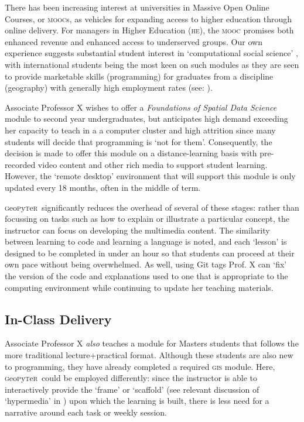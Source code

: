 \documentclass[letter, 11pt,titlepage]{article}
\newcommand{\gp}{\textsc{g}eo\textsc{p}y\textsc{t}e\textsc{r}~\/}
\begin{document}
There has been increasing interest at universities in Massive Open Online Courses, or \textsc{mooc}s, as vehicles for expanding access to higher education through online delivery. For managers in Higher Education (\textsc{he}), the \textsc{mooc} promises both enhanced revenue and enhanced access to underserved groups. Our own experience suggests substantial student interest in `computational social science' \citep{Lazer2009}, with international students being the most keen on such modules as they are seen to provide marketable skills (programming) for graduates from a discipline (geography) with generally high employment rates (see: \citeauthor{rgs2017} \citeyear{rgs2017}).

Associate Professor X wishes to offer a \emph{Foundations of Spatial Data Science} module to second year undergraduates, but anticipates high demand exceeding her capacity to teach in a a computer cluster and high attrition since many students will decide that programming is `not for them'. Consequently, the decision is made to offer this module on a distance-learning basis with pre-recorded video content and other rich media to support student learning. However, the `remote desktop' environment that will support this module is only updated every 18 months, often in the middle of term.

\gp significantly reduces the overhead of several of these stages: rather than focussing on tasks such as how to explain or illustrate a particular concept, the instructor can focus on developing the multimedia content. The similarity between learning to code and learning a language is noted, and each `lesson' is designed to be completed in under an hour so that students can proceed at their own pace without being overwhelmed. As well, using Git tags Prof. X can `fix' the version of the code and explanations used to one that is appropriate to the computing environment while continuing to update her teaching materials.

\subsection{In-Class Delivery}\label{in-class-delivery}

Associate Professor X \emph{also} teaches a module for Masters students that follows the more traditional lecture+practical format. Although these students are also new to programming, they have already completed a required \textsc{gis} module. Here, \gp could be employed differently: since the instructor is able to interactively provide the `frame' or `scaffold' (see relevant discussion of `hypermedia' in \citealp{Azevedo2008}) upon which the learning is built, there is less need for a narrative around each task or weekly session. 
\end{document}
